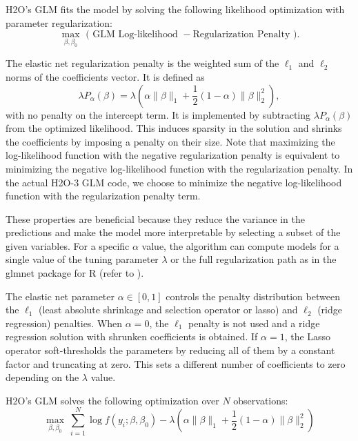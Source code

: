 H2O's GLM fits the model by solving the following likelihood optimization with parameter regularization:
 $$\max_{\beta,\beta_0} \mbox{  ( GLM Log-likelihood }  - \mbox{Regularization Penalty )} .$$

The elastic net regularization penalty is the weighted sum of the $\ell_1$ and $\ell_2$ norms of the coefficients vector. It is defined as $$\lambda P_{\alpha}(\beta) = \lambda \left(\alpha \| \beta \|_1 + \frac{1}{2} (1- \alpha) \| \beta \|_2^2 \right),$$ with no penalty on the intercept term. It is implemented by subtracting $\lambda P_{\alpha}(\beta)$ from the optimized likelihood. This induces sparsity in the solution and shrinks the coefficients by imposing a penalty on their size. Note that maximizing the log-likelihood function with the negative regularization penalty is equivalent to minimizing the negative log-likelihood function with the regularization penalty. In the actual H2O-3 GLM code, we choose to minimize the negative log-likelihood function with the regularization penalty term.

These properties are beneficial because they reduce the variance in the predictions and make the model more interpretable by selecting a subset of the given variables. For a specific $\alpha$ value, the algorithm can compute models for a single value of the tuning parameter $\lambda$ or the full regularization path as in the glmnet package for R (refer to ).

The elastic net parameter $\alpha \in [0,1]$ controls the penalty distribution between the $\ell_1$ (least absolute shrinkage and selection operator or lasso) and $\ell_2$ (ridge regression)
penalties. When $\alpha=0$, the $\ell_1$ penalty is not used and a
ridge regression solution with shrunken coefficients is obtained. If $\alpha=1$, the Lasso operator soft-thresholds the parameters by reducing all of them by a constant factor and truncating at zero. This sets a different number of coefficients to zero depending on the $\lambda$ value.
 
H2O's GLM  solves the following optimization over $N$ observations:
$$ \max_{\beta,\beta_0}  \  \sum_{i=1}^N \log f\left(y_i ; \beta,\beta_0\right)  - \lambda \left(\alpha \| \beta \|_1 +  \frac{1}{2} (1- \alpha)\| \beta \|_2^2 \right) $$




